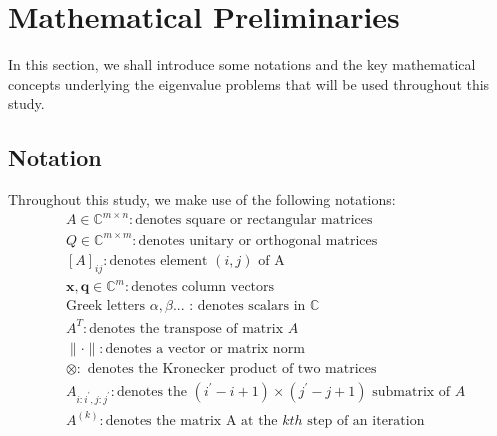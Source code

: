 \section{Mathematical Preliminaries}
In this section, we shall introduce some notations and the key mathematical concepts underlying the eigenvalue problems that will be used throughout this study.
\subsection{Notation}
Throughout this study, we make use of the following notations:
\begin{align*}\nonumber
	&A \in \mathbb{C}^{m\times n}: \text{denotes square or rectangular matrices}\\
	&Q \in \mathbb{C}^{m\times m}: \text{denotes unitary or orthogonal matrices}\\
	&[A]_{ij}: \text{denotes element $(i, j)$ of A}\\
	&\mathbf{x}, \mathbf{q} \in \mathbb{C}^{m}: \text{denotes column vectors}\\
	&\text{Greek letters }\alpha, \beta\text{...} \text{ : denotes scalars in $\mathbb{C}$}\\
	&A^{T}: \text{denotes the transpose of matrix $A$}\\
	&\| \cdot \|: \text{denotes a vector or matrix norm }\\
	& \otimes: \text{ denotes the Kronecker product of two matrices}\\
	&A_{i:i^\prime, j:j^\prime}: \text{denotes the $(i^\prime - i + 1) \times (j^\prime - j + 1)$ submatrix of $A$}\\
	&A^{(k)}: \text{denotes the matrix A at the $kth$ step of an iteration}
\end{align*}
